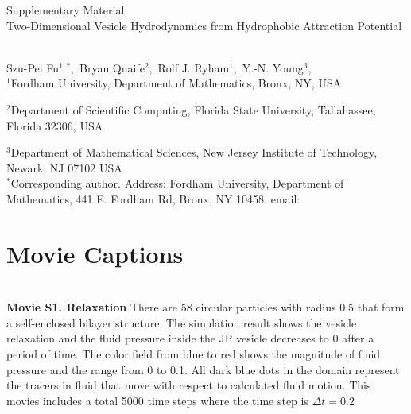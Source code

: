 
\thispagestyle{empty}

\newpage
{\Large \bf

  \noindent Supplementary Material\\

  \noindent 
  Two-Dimensional Vesicle Hydrodynamics from Hydrophobic Attraction Potential}\\

\noindent 
Szu-Pei Fu$^{1,*},$ 
Bryan Quaife$^{2},$ 
Rolf J. Ryham$^{1},$ 
Y.-N. Young$^{3},$
\\


\noindent
$^{1}$Fordham University, Department of Mathematics,  Bronx, NY, USA

\noindent
$^{2}$Department of Scientific Computing, Florida State University, Tallahassee, Florida 32306, USA

\noindent
$^{3}$Department of Mathematical Sciences, New Jersey Institute of Technology, Newark, NJ  07102 USA
\\

\noindent $^*$Corresponding author. Address: Fordham University, Department of Mathematics, 441 E. Fordham Rd, Bronx, NY 10458. email: 



\setcounter{page}{1}

\setcounter{figure}{0}
\renewcommand{\thefigure}{S\arabic{figure}}

\setcounter{equation}{0}
\renewcommand{\theequation}{S\arabic{equation}}

\setcounter{section}{0}
\renewcommand{\thesection}{S\arabic{section}}   





\sloppy
\section{Movie Captions}\mbox{} \\

\noindent
{\bf Movie S1. Relaxation} There are 58 circular particles with radius 0.5 that form a self-enclosed bilayer structure. The simulation result shows the vesicle relaxation and the fluid pressure inside the JP vesicle decreases to 0 after a period of time.
The color field from blue to red shows the magnitude of fluid pressure and the range from 0 to 0.1. All dark blue dots in the domain represent the tracers in fluid that move with respect to calculated fluid motion.
This movies includes a total 5000 time steps where the time step is $\Delta t=0.2$\\



